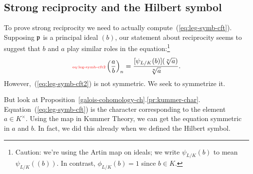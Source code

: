 \subsection{Strong reciprocity and the Hilbert symbol}
To prove strong reciprocity we need to actually compute~(\ref{eq:leg-symb-cft}). Supposing $\mathfrak{p}$ is a principal ideal $(b)$, our statement about reciprocity seems to suggest that $b$ and $a$ play similar roles in the equation:\footnote{Caution: we're using the Artin map on ideals; we write $\psi_{L/K}(b)$ to mean $\psi_{L/K}((b))$. In contrast, $\phi_{L/K}(b)=1$ since $b\in K$.}
\begin{equation}\llabel{eq:leg-symb-cft2}
\pf{a}{b}_n=\fc{[\psi_{L/K}(b)](\sqrt[n]{a})}{\sqrt[n]a}.
\end{equation}
However,~(\ref{eq:leg-symb-cft2}) is not symmetric. We seek to symmetrize it.

But look at Proposition~\ref{galois-cohomology-ch}.\ref{pr:kummer-char}. Equation~(\ref{eq:leg-symb-cft}) is the character corresponding to the element $a\in K^{\times}$. Using the map in Kummer Theory, we can get the equation symmetric in $a$ and $b$. In fact, we did this already when we defined the Hilbert symbol.

